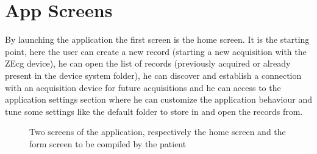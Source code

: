 \section{App Screens}
By launching the application the first screen is the home screen. It is the starting point, here the user can create a new record (starting a new acquisition with the ZEcg device), he can open the list of records (previously acquired or already present in the device system folder), he can discover and establish  a connection with an acquisition device for future acquisitions and he can access to the application settings section where he can customize the application behaviour and tune some settings like the default folder to store in and open the records from.
\begin{figure}[!htb]
\centering
{}
\qquad
{}
\caption{Two screens of the application, respectively the home screen and the form screen to be compiled by the patient}  
\label{fig10.1ab}
\end{figure}
